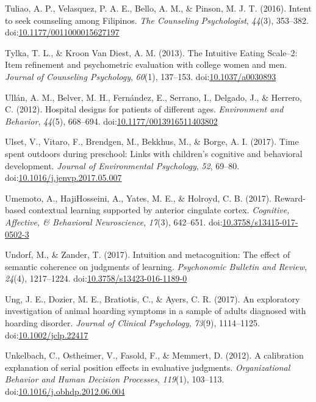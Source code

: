 \documentclass[english,man]{apa6}
\theoremstyle{definition}
\theoremstyle{definition}
\theoremstyle{definition}
\theoremstyle{remark}
\begin{document}
\hypertarget{ref-Tuliao2016}{}
Tuliao, A. P., Velasquez, P. A. E., Bello, A. M., \& Pinson, M. J. T.
(2016). Intent to seek counseling among Filipinos. \emph{The Counseling
Psychologist}, \emph{44}(3), 353--382.
doi:\href{https://doi.org/10.1177/0011000015627197}{10.1177/0011000015627197}

\hypertarget{ref-Tylka2013}{}
Tylka, T. L., \& Kroon Van Diest, A. M. (2013). The Intuitive Eating
Scale--2: Item refinement and psychometric evaluation with college women
and men. \emph{Journal of Counseling Psychology}, \emph{60}(1),
137--153. doi:\href{https://doi.org/10.1037/a0030893}{10.1037/a0030893}

\hypertarget{ref-Ullan2012}{}
Ullán, A. M., Belver, M. H., Fernández, E., Serrano, I., Delgado, J., \&
Herrero, C. (2012). Hospital designs for patients of different ages.
\emph{Environment and Behavior}, \emph{44}(5), 668--694.
doi:\href{https://doi.org/10.1177/0013916511403802}{10.1177/0013916511403802}

\hypertarget{ref-Ulset2017}{}
Ulset, V., Vitaro, F., Brendgen, M., Bekkhus, M., \& Borge, A. I.
(2017). Time spent outdoors during preschool: Links with children's
cognitive and behavioral development. \emph{Journal of Environmental
Psychology}, \emph{52}, 69--80.
doi:\href{https://doi.org/10.1016/j.jenvp.2017.05.007}{10.1016/j.jenvp.2017.05.007}

\hypertarget{ref-Umemoto2017}{}
Umemoto, A., HajiHosseini, A., Yates, M. E., \& Holroyd, C. B. (2017).
Reward-based contextual learning supported by anterior cingulate cortex.
\emph{Cognitive, Affective, \& Behavioral Neuroscience}, \emph{17}(3),
642--651.
doi:\href{https://doi.org/10.3758/s13415-017-0502-3}{10.3758/s13415-017-0502-3}

\hypertarget{ref-Undorf2016}{}
Undorf, M., \& Zander, T. (2017). Intuition and metacognition: The
effect of semantic coherence on judgments of learning. \emph{Psychonomic
Bulletin and Review}, \emph{24}(4), 1217--1224.
doi:\href{https://doi.org/10.3758/s13423-016-1189-0}{10.3758/s13423-016-1189-0}

\hypertarget{ref-Ung2017}{}
Ung, J. E., Dozier, M. E., Bratiotis, C., \& Ayers, C. R. (2017). An
exploratory investigation of animal hoarding symptoms in a sample of
adults diagnosed with hoarding disorder. \emph{Journal of Clinical
Psychology}, \emph{73}(9), 1114--1125.
doi:\href{https://doi.org/10.1002/jclp.22417}{10.1002/jclp.22417}

\hypertarget{ref-Unkelbach2012}{}
Unkelbach, C., Ostheimer, V., Fasold, F., \& Memmert, D. (2012). A
calibration explanation of serial position effects in evaluative
judgments. \emph{Organizational Behavior and Human Decision Processes},
\emph{119}(1), 103--113.
doi:\href{https://doi.org/10.1016/j.obhdp.2012.06.004}{10.1016/j.obhdp.2012.06.004}
\end{document}

